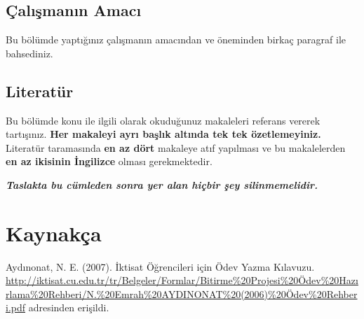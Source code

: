 \documentclass[
  12pt,
]{article}
\newlength{\cslhangindent}
\newlength{\cslentryspacingunit} %
\newenvironment{CSLReferences}[2] %
 {%
  \setlength{\parindent}{0pt}
  \ifodd #1
  \let\oldpar\par
  \def\par{\hangindent=\cslhangindent\oldpar}
  \fi
  \setlength{\parskip}{#2\cslentryspacingunit}
 }%
 {}
\begin{document}
\hypertarget{uxe7alux131ux15fmanux131n-amacux131}{%
\subsection{Çalışmanın Amacı}\label{uxe7alux131ux15fmanux131n-amacux131}}

Bu bölümde yaptığınız çalışmanın amacından ve öneminden birkaç paragraf ile bahsediniz.

\hypertarget{literatuxfcr}{%
\subsection{Literatür}\label{literatuxfcr}}

Bu bölümde konu ile ilgili olarak okuduğunuz makaleleri referans vererek tartışınız. \textbf{Her makaleyi ayrı başlık altında tek tek özetlemeyiniz.} Literatür taramasında \textbf{en az dört} makaleye atıf yapılması ve bu makalelerden \textbf{en az ikisinin İngilizce} olması gerekmektedir.

\textbf{\emph{Taslakta bu cümleden sonra yer alan hiçbir şey silinmemelidir.}}

\newpage

\hypertarget{references}{%
\section{Kaynakça}\label{references}}

\hypertarget{refs}{}
\begin{CSLReferences}{1}{0}
\leavevmode{}%
Aydınonat, N. E. (2007). İktisat Öğrencileri için Ödev Yazma Kılavuzu. \url{http://iktisat.cu.edu.tr/tr/Belgeler/Formlar/Bitirme\%20Projesi\%20Ödev\%20Hazırlama\%20Rehberi/N.\%20Emrah\%20AYDINONAT\%20(2006)\%20Ödev\%20Rehberi.pdf} adresinden erişildi.

\end{CSLReferences}
\end{document}
